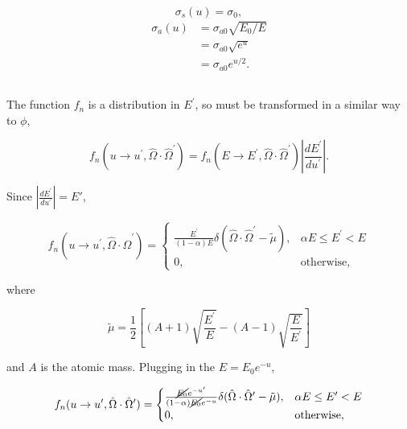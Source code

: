 \documentclass{hw-template}
\newcommand{\p}{^\prime}
\newcommand{\hOm}{\hat{\Omega}}
\begin{document}
\begin{equation}
    \sigma_s(u) = \sigma_0,
\end{equation}
\begin{align}
    \sigma_a(u) &= \sigma_{a0}\sqrt{E_0/E}\\
                &= \sigma_{a0}\sqrt{e^u}\\
                &= \sigma_{a0}e^{u/2}.
\end{align}

\subsection{}

The function $f_n$ is a distribution in $E\p$, so must be transformed in a similar way to $\phi$,

\begin{equation}
    f_n(u \rightarrow u\p, \hOm \cdot \hOm\p) = f_n(E \rightarrow E\p,\hOm\cdot\hOm\p)\left|\frac{dE\p}{du\p} \right|.
\end{equation}

Since $\left|\frac{dE\p}{du\p} \right| = E\prime$,

\begin{equation}
    f_n(u \rightarrow u\p, \hOm \cdot \hOm\p) = \begin{cases}
        \frac{E\p}{(1-\alpha)E}\delta(\hOm \cdot \hOm\p - \tilde{\mu}), & \alpha E \leq E\p < E\\
        0, & \text{otherwise},
    \end{cases}
\end{equation}

where

\begin{equation}
    \tilde{\mu} = \frac{1}{2}\left[(A+1)\sqrt{\frac{E\p}{E}} - (A-1)\sqrt{\frac{E}{E\p}} \right]
\end{equation}

and $A$ is the atomic mass. Plugging in the $E = E_0 e^{-u}$,

\begin{equation}
    f_n(u \rightarrow u\p, \hOm \cdot \hOm\p) = \begin{cases}
        \frac{\cancel{E_0} e^{-u\p}}{(1-\alpha)\cancel{E_0} e^{-u}}\delta(\hOm \cdot \hOm\p - \tilde{\mu}), & \alpha E \leq E\p < E\\
        0, & \text{otherwise},
    \end{cases}
\end{equation}
\end{document}
